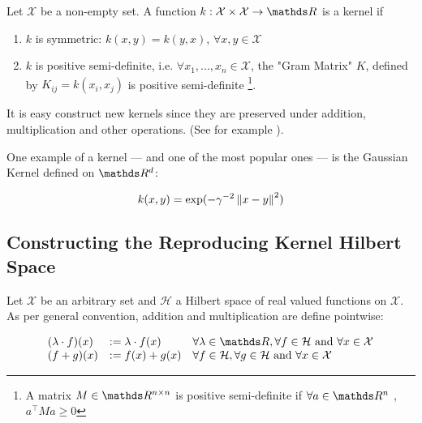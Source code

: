 \begin{definition}
    Let $\mathcal{X}$ be a non-empty set. A function 
    $k: \mathcal{X} \times \mathcal{X} \rightarrow \R$ is a kernel if 
    \begin{enumerate}
        \item $k$ is symmetric: $k(x, y) = k(y, x)$, $\forall x, y \in \mathcal{X}$
        \item $k$ is positive semi-definite, i.e. $\forall x_1, ..., x_n \in \mathcal{X}$,
        the "Gram Matrix" $K$, defined by $K_{ij} = k(x_i, x_j)$ is positive semi-definite
        \footnote{A matrix $M \in \R^{n\times n}$ is positive semi-definite if $\forall a \in \R^n$
        , $a^\intercal Ma \geq 0$}.
    \end{enumerate}
\end{definition}

It is easy construct new kernels since they are preserved under addition, multiplication and other operations. 
(See for example \cite{GrettonNotes}).

One example of a kernel --- and one of the most popular ones --- is the Gaussian Kernel defined on $\R^d$:

$$
    k(x, y) = \exp (-\gamma^{-2}\left\lVert x - y\right\rVert^2)
$$

\subsection{Constructing the Reproducing Kernel Hilbert Space}

Let $\mathcal{X}$ be an arbitrary set and $\mathcal{H}$ a Hilbert space of real valued functions
on $\mathcal{X}$. As per general convention, addition and multiplication are define pointwise:

\begin{equation}
    \begin{array}{lll}
    (\lambda \cdot f)(x) & :=\lambda \cdot f(x) & \forall \lambda \in \R, \forall f \in \mathcal{H} \text { and } \forall x \in \mathcal{X} \\
    (f+g)(x) & :=f(x)+g(x) & \forall f \in \mathcal{H}, \forall g \in \mathcal{H} \text { and } \forall x \in \mathcal{X}
    \end{array}
\end{equation}


